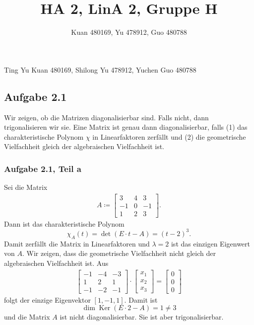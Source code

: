 \documentclass[draft,a5paper]{article}
\title{HA 2, LinA 2, Gruppe H}
\author{Kuan 480169, Yu 478912, Guo 480788}
\theoremstyle{remark}
\DeclareMathOperator{\Ker}{Ker}
\begin{document}
\maketitle
\begin{center}
  Ting Yu Kuan 480169, Shilong Yu 478912, Yuchen Guo 480788
\end{center}
\subsection{Aufgabe 2.1}
Wir zeigen, ob die Matrizen diagonalisierbar sind.  Falls nicht, dann
trigonalisieren wir sie.  Eine Matrix ist genau dann diagonalisierbar,
falls (1) das charakteristische Polynom \(\chi\) in Linearfaktoren zerfällt
und (2) die geometrische Vielfachheit gleich der algebraischen
Vielfachheit ist.

\subsubsection{Aufgabe 2.1, Teil a}
Sei die Matrix
\begin{align*}
  A \coloneq
  \begin{bmatrix}
    3 & 4 & 3 \\
    -1 & 0 & -1 \\
    1 & 2 & 3
  \end{bmatrix}.
\end{align*}
Dann ist das charakteristische Polynom
\[\chi_{A}(t) = \det(E \cdot t - A) =(t-2)^{3}. \] Damit zerfällt die
Matrix in Linearfaktoren und \(\lambda = 2\) ist das einzigen Eigenwert von
\(A\).  Wir zeigen, dass die geometrische Vielfachheit nicht gleich
der algebraischen Vielfachheit ist.  Aus
\begin{align*}
  \begin{bmatrix}
    -1 & -4 & -3 \\
    1 & 2 & 1 \\
    -1 & -2 & -1
  \end{bmatrix}
  \cdot
  \begin{bmatrix}
    x_{1} \\ x_{2} \\ x_{3}
  \end{bmatrix}
  =
  \begin{bmatrix}
    0 \\ 0 \\ 0
  \end{bmatrix}
\end{align*}
folgt der einzige Eigenvektor \([1, -1, 1]\).  Damit ist
\[\dim \Ker (E \cdot 2 - A)  = 1 \ne 3\]
und die Matrix \(A\) ist nicht diagonalisierbar.  Sie ist aber
trigonalisierbar.
\end{document}
